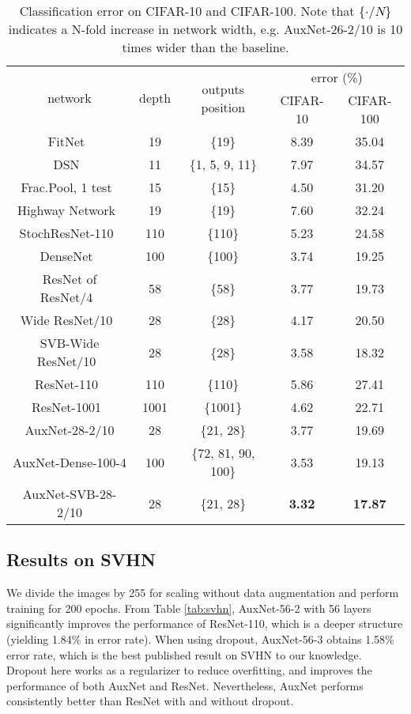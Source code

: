 \documentclass[10pt,onecolumn,letterpaper]{article}
\def\kui{\textcolor{black}}
\def\SexyName{AuxNet\xspace}
\begin{document}
\begin{table}[h]
  \centering
  \caption{Classification error on CIFAR-10 and CIFAR-100. Note that \kui{\{$\cdot$/$N$\}} indicates a N-fold increase in network width, e.g. \SexyName-26-2/10 is 10 times wider than the baseline.}
    \begin{tabular}{c|c|c|c|c}
    \hline
    \multirow{2}[0]{*}{network} & \multirow{2}[0]{*}{depth} & \multirow{2}[0]{*}{outputs position} & \multicolumn{2}{c}{error (\%)} \\
    \cline{4-5}
        &   &   & CIFAR-10 & CIFAR-100 \\
    \hline
    FitNet~\cite{romero2014fitnets} & 19 & \{19\}  & 8.39 & 35.04 \\
    DSN~\cite{Lee2015} & 11 & \{1, 5, 9, 11\}  & 7.97 & 34.57 \\
    Frac.Pool, 1 test~\cite{graham2014fractional} & 15 & \{15\}  & 4.50 & 31.20 \\
    Highway Network~\cite{srivastava2015highway} & 19 & \{19\}  & 7.60 & 32.24 \\
    StochResNet-110~\cite{DBLP:journals/corr/HuangSLSW16} & 110 & \{110\} & 5.23 & 24.58 \\
    DenseNet~\cite{huang2016densely} & 100 & \{100\} & 3.74 & 19.25 \\
    ResNet of ResNet/4~\cite{zhang2016residual} & 58 & \{58\} & 3.77 & 19.73 \\
    Wide ResNet/10~\cite{zagoruyko2016wide} & 28 & \{28\} & 4.17 & 20.50 \\
    SVB-Wide ResNet/10~\cite{jia2016improving} & 28 & \{28\} & 3.58 & 18.32 \\
    ResNet-110~\cite{he2016identity} & 110   & \{110\} & 5.86 & 27.41 \\
    ResNet-1001~\cite{he2016identity} & 1001   & \{1001\} & 4.62 & 22.71 \\
    \hline
    \SexyName-28-2/10 & 28   & \{21, 28\} & 3.77 & 19.69 \\
    \SexyName-Dense-100-4 & 100  & \{72, 81, 90, 100\} & 3.53 & 19.13 \\
    \SexyName-SVB-28-2/10    & 28  & \{21, 28\} & \textbf{3.32} & \textbf{17.87} \\
    \hline
    \end{tabular}
  \label{tab:cifar}%
\end{table}

\subsection{Results on SVHN}
We divide the images by 255 for scaling without data augmentation and perform training for 200 epochs. From Table \ref{tab:svhn}, \SexyName-56-2 with 56 layers significantly improves the performance of ResNet-110, which is a deeper structure (yielding 1.84\% in error rate). When using dropout, \SexyName-56-3 obtains 1.58\% error rate, which is the best published result on SVHN to our knowledge. Dropout here works as a regularizer to reduce overfitting, and improves the performance of both \SexyName and ResNet. Nevertheless, \SexyName performs consistently better than ResNet with and without dropout.
\end{document}
